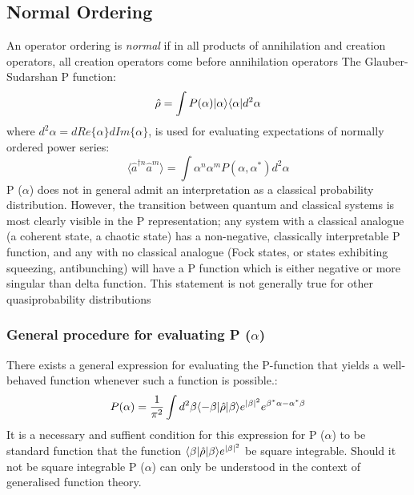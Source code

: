 \subsection{Normal Ordering}
An operator ordering is \emph{normal} if in all products of annihilation and creation operators, all creation operators come before annihilation operators \cite{Mandl2010} The Glauber-Sudarshan P function\cite{Cahill1969}:
\begin{equation}
	\hat{\rho} = \int P(\alpha) | \alpha \rangle \langle \alpha | d^2 \alpha
	\end{equation}
where $d^2 \alpha = dRe\{\alpha \}dIm\{\alpha \}$, is used for evaluating expectations of normally ordered power series:
\begin{equation}
	\langle \hat{a}^{\dagger n} \hat{a}^{m}  \rangle = \int \alpha^n \alpha^m P (\alpha, \alpha^*) d^2 \alpha
\end{equation}
P ($\alpha$) does not in general admit an interpretation as a classical probability distribution. However, the transition between quantum and classical systems is most clearly visible in the P representation; any system with a classical analogue (a coherent state, a chaotic state) has a non-negative, classically interpretable P function, and any with no classical analogue (Fock states, or states exhibiting squeezing, antibunching) will have a P function which is either negative or more singular than delta function. This statement is not generally true for other quasiprobability distributions\cite{Mandel1995}
\subsubsection{General procedure for evaluating P ($\alpha$)}
\label{mehta}
There exists a general expression for evaluating the P-function that yields a well-behaved function whenever such a function is possible.\cite{Mehta1967}:
\begin{equation}
	P(\alpha) = \frac{1}{\pi^2} \int d^2 \beta \langle-\beta | \hat{\rho} | \beta \rangle e^{|\beta|^2} e^{\beta^* \alpha -\alpha^* \beta}
\end{equation}
It is a necessary and suffient condition for this expression for P ($\alpha$) to be standard function that the function $ \langle\beta | \hat{\rho} | \beta \rangle e^{|\beta|^2} $ be square integrable. Should it not be square integrable P ($\alpha$) can only be understood in the context of generalised function theory.
